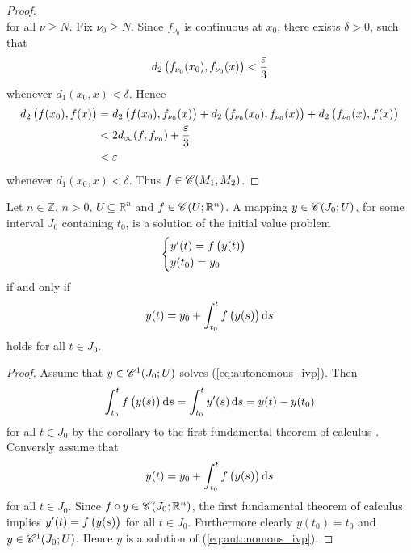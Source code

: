 \begin{proof}
\begin{equation*}
\end{equation*}
\noindent for all $\nu \geq N$. Fix $\nu_0 \geq N$. Since $f_{\nu_0}$ is continuous at $x_0$, there exists $\delta > 0$, such that
\begin{equation*}
d_2\del[1]{f_{\nu_0}(x_0),f_{\nu_0}(x)} < \frac{\varepsilon}{3}
\end{equation*}
\noindent whenever $d_1(x_0,x) < \delta$. Hence
\begin{align*}
d_2\del[1]{f(x_0),f(x)} &= d_2\del[1]{f(x_0),f_{\nu_0}(x)} + d_2\del[1]{f_{\nu_0}(x_0),f_{\nu_0}(x)} + d_2\del[1]{f_{\nu_0}(x),f(x)}\\
&< 2 d_\infty(f,f_{\nu_0}) + \frac{\varepsilon}{3}\\
&< \varepsilon
\end{align*}
\noindent whenever $d_1(x_0,x) < \delta$. Thus $f \in \mathscr{C}(M_1;M_2)$. 
\end{proof}

\begin{lemma}
Let $n \in \mathbb{Z}$, $n > 0$, $U \subseteq \mathbb{R}^n$ and $f \in \mathscr{C}(U;\mathbb{R}^n)$. A mapping $y \in \mathscr{C}(J_0;U)$, for some interval $J_0$ containing $t_0$, is a solution of the initial value problem
\begin{equation}
\begin{cases}
y'(t) = f\del[1]{y(t)}\\
y(t_0) = y_0
\end{cases}
\label{eq:autonomous_ivp}
\end{equation}
\noindent if and only if
\begin{equation}
y(t) = y_0 + \int_{t_0}^t f\del[1]{y(s)}\d s
\end{equation}
\noindent holds for all $t \in J_0$.
\label{lem:reformulation}
\end{lemma}

\begin{proof}
Assume that $y \in \mathscr{C}^1(J_0;U)$ solves (\ref{eq:autonomous_ivp}). Then  
\begin{equation*}
\int_{t_0}^t f\del[1]{y(s)} \d s = \int_{t_0}^t y'(s)\d s = y(t) - y(t_0)
\end{equation*}
\noindent for all $t \in J_0$ by the corollary to the first fundamental theorem of calculus \cite[284]{spivak:calculus:1994}.\\
Conversly assume that 
\begin{equation*}
y(t) = y_0 + \int_{t_0}^t f\del[1]{y(s)}\d s
\end{equation*}
\noindent for all $t \in J_0$. Since $f \circ y \in \mathscr{C}(J_0;\mathbb{R}^n)$, the first fundamental theorem of calculus \cite[282]{spivak:calculus:1994} implies $y'(t) = f\del[1]{y(s)}$ for all $t \in J_0$. Furthermore clearly $y(t_0) = t_0$ and $y \in \mathscr{C}^1(J_0;U)$. Hence $y$ is a solution of (\ref{eq:autonomous_ivp}). 
\end{proof}

